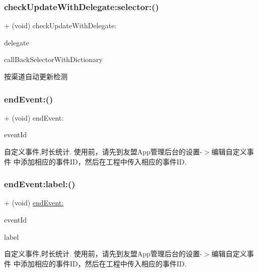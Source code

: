 \subsubsection{\texorpdfstring{check\+Update\+With\+Delegate\+:selector\+:()}{checkUpdateWithDelegate:selector:()}}
{\footnotesize\ttfamily + (void) check\+Update\+With\+Delegate\+: \begin{DoxyParamCaption}\item[{(id)}]{delegate }\item[{selector:(S\+EL)}]{call\+Back\+Selector\+With\+Dictionary }\end{DoxyParamCaption}}

按渠道自动更新检测 \mbox{\label{interfaceMobClick_a34af6442499678c6f6b5b46c8954cd7a}} 
\subsubsection{\texorpdfstring{end\+Event\+:()}{endEvent:()}}
{\footnotesize\ttfamily + (void) end\+Event\+: \begin{DoxyParamCaption}\item[{(N\+S\+String $\ast$)}]{event\+Id }\end{DoxyParamCaption}}

自定义事件,时长统计. 使用前，请先到友盟\+App管理后台的设置-\/$>$编辑自定义事件 中添加相应的事件\+I\+D，然后在工程中传入相应的事件\+ID. \mbox{\label{interfaceMobClick_a989f2b9e8f0661036f8956aee786bef0}} 
\subsubsection{\texorpdfstring{end\+Event\+:label\+:()}{endEvent:label:()}}
{\footnotesize\ttfamily + (void) \hyperlink{interfaceMobClick_a34af6442499678c6f6b5b46c8954cd7a}{end\+Event\+:} \begin{DoxyParamCaption}\item[{(N\+S\+String $\ast$)}]{event\+Id }\item[{label:(N\+S\+String $\ast$)}]{label }\end{DoxyParamCaption}}

自定义事件,时长统计. 使用前，请先到友盟\+App管理后台的设置-\/$>$编辑自定义事件 中添加相应的事件\+I\+D，然后在工程中传入相应的事件\+ID. \mbox{\label{interfaceMobClick_a7e1a02ba6cbbdd7dabb1dfde800560bb}} 
